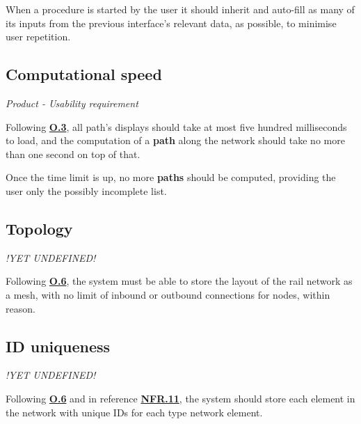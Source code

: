 \documentclass[12pt]{article}
\renewcommand\bf[1]{\textbf{#1}}
\renewcommand\it[1]{\textit{#1}}
\newcommand\hyl[1]{\hyperref[#1]{\bf{#1}}}
\begin{document}
When a procedure is started by the user it should inherit and auto-fill as many of its inputs from the previous interface's relevant data, as possible, to minimise user repetition.

\subsection{Computational speed} \label{NFR.10}
\it{Product - Usability requirement}

Following \hyl{O.3}, all path's displays should take at most five hundred milliseconds to load, and the computation of a \bf{path} along the network should take no more than one second on top of that. 

Once the time limit is up, no more \bf{paths} should be computed, providing the user only the possibly incomplete list.

\subsection{Topology} \label{NFR.11}
\it{!YET UNDEFINED!}

Following \hyl{O.6}, the system must be able to store the layout of the rail network as a mesh,
with no limit of inbound or outbound connections for nodes, within reason.

\subsection{ID uniqueness} \label{NFR.12}
\it{!YET UNDEFINED!}

Following \hyl{O.6} and in reference \hyl{NFR.11}, the system should store each element in the network with unique IDs for 
each type network element.
\end{document}
